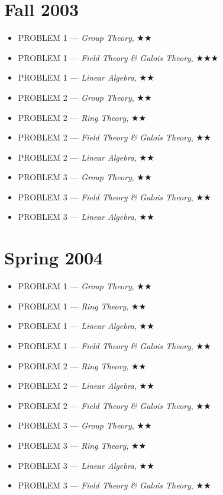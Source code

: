 \documentclass[11pt,letterpaper]{book}
\begin{document}
\section*{Fall 2003}
\begin{itemize}
\item PROBLEM 1 --- \textit{Group Theory}, $\bigstar\bigstar$
\item PROBLEM 1 --- \textit{Field Theory \& Galois Theory}, $\bigstar\bigstar\bigstar$
\item PROBLEM 1 --- \textit{Linear Algebra}, $\bigstar\bigstar$
\item PROBLEM 2 --- \textit{Group Theory}, $\bigstar\bigstar$
\item PROBLEM 2 --- \textit{Ring Theory}, $\bigstar\bigstar$
\item PROBLEM 2 --- \textit{Field Theory \& Galois Theory}, $\bigstar\bigstar$
\item PROBLEM 2 --- \textit{Linear Algebra}, $\bigstar\bigstar$
\item PROBLEM 3 --- \textit{Group Theory}, $\bigstar\bigstar$
\item PROBLEM 3 --- \textit{Field Theory \& Galois Theory}, $\bigstar\bigstar$
\item PROBLEM 3 --- \textit{Linear Algebra}, $\bigstar\bigstar$
\end{itemize}

\section*{Spring 2004}
\begin{itemize}
\item PROBLEM 1 --- \textit{Group Theory}, $\bigstar\bigstar$
\item PROBLEM 1 --- \textit{Ring Theory}, $\bigstar\bigstar$
\item PROBLEM 1 --- \textit{Linear Algebra}, $\bigstar\bigstar$
\item PROBLEM 1 --- \textit{Field Theory \& Galois Theory}, $\bigstar\bigstar$
\item PROBLEM 2 --- \textit{Ring Theory}, $\bigstar\bigstar$
\item PROBLEM 2 --- \textit{Linear Algebra}, $\bigstar\bigstar$
\item PROBLEM 2 --- \textit{Field Theory \& Galois Theory}, $\bigstar\bigstar$
\item PROBLEM 3 --- \textit{Group Theory}, $\bigstar\bigstar$
\item PROBLEM 3 --- \textit{Ring Theory}, $\bigstar\bigstar$
\item PROBLEM 3 --- \textit{Linear Algebra}, $\bigstar\bigstar$
\item PROBLEM 3 --- \textit{Field Theory \& Galois Theory}, $\bigstar\bigstar$
\end{itemize}
\end{document}
